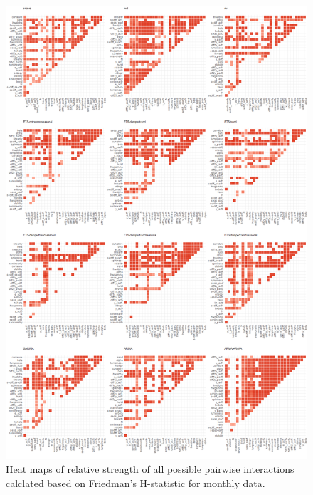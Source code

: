 \documentclass[11pt,a4paper,]{article}
\theoremstyle{definition}
\theoremstyle{definition}
\theoremstyle{definition}
\theoremstyle{remark}
\begin{document}
\begin{figure}
\centering
\includegraphics{figures/friedmanM-1.png}
\caption{\label{fig:friedmanM}Heat maps of relative strength of all possible
pairwise interactions calclated based on Friedman's H-statistic for
monthly data.}
\end{figure}

\newpage
\end{document}
